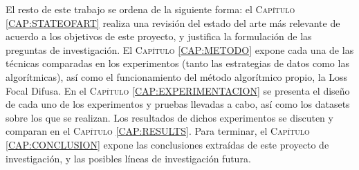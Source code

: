 El resto de este trabajo se ordena de la siguiente forma: el \textsc{Capítulo \ref{CAP:STATEOFART}} realiza una revisión del estado del arte más relevante de acuerdo a los objetivos de este proyecto, y justifica la formulación de las preguntas de investigación. El \textsc{Capítulo \ref{CAP:METODO}} expone cada una de las técnicas comparadas en los experimentos (tanto las estrategias de datos como las algorítmicas), así como el funcionamiento del método algorítmico propio, la Loss Focal Difusa. En el \textsc{Capítulo \ref{CAP:EXPERIMENTACION}} se presenta el diseño de cada uno de los experimentos y pruebas llevadas a cabo, así como los datasets sobre los que se realizan. Los resultados de dichos experimentos se discuten y comparan en el \textsc{Capítulo \ref{CAP:RESULTS}}. Para terminar, el \textsc{Capítulo \ref{CAP:CONCLUSION}} expone las conclusiones extraídas de este proyecto de investigación, y las posibles líneas de investigación futura.